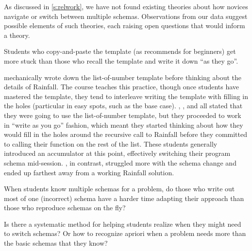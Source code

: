 As discussed in \cref{s:relwork}, we have not found existing theories
about how novices navigate or switch between multiple schemas. 
Observations from our data suggest possible elements of such theories,
each raising open questions that would inform a theory.


\begin{obs}
Students who copy-and-paste the template (as \htdp recommends for
beginners) get more stuck than those who recall the template and write
it down ``as they go''.
\end{obs}

\sthree mechanically wrote down the
list-of-number template before thinking about the details of
Rainfall. The course teaches this practice, though once students have
mastered the template, they tend to interleave writing the template
with filling in the holes (particular in easy spots, such as the base case).  \ssix,
\sseven, and \sten all stated that they were going to use the
list-of-number template, but they proceeded to work in ``write as you
go'' fashion, which meant they started thinking about how they would
fill in the holes around the recursive call to Rainfall before they
committed to calling their function on the rest of the list.  These
students 
generally introduced an accumulator at this point, effectively
switching their program schema mid-session.  \sthree, in contrast,
struggled more with the schema change and ended up farthest away from
a working Rainfall solution.

\begin{openq}
When students know multiple schemas for a problem, do those who write
out most of one (incorrect) schema have a harder time adapting their approach
than those who reproduce schemas on the fly?
\end{openq}


\begin{openq}
Is there a systematic method for helping students realize when
they might need to switch schemas?  Or how to recognize apriori when a
problem needs more than the basic schemas that they know?
\label{oq:when-to-switch}
\end{openq}


